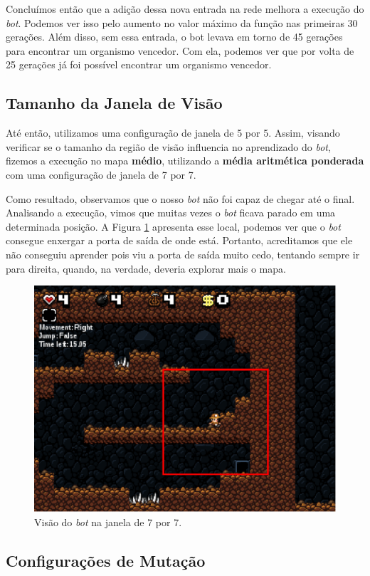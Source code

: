 Concluímos então que a adição dessa nova entrada na rede melhora a execução do
\textit{bot}. Podemos ver isso pelo aumento no valor máximo da função nas
primeiras 30 gerações. Além disso, sem essa entrada, o bot levava em torno de
45 gerações para encontrar um organismo vencedor. Com ela, podemos ver que por
volta de 25 gerações já foi possível encontrar um organismo vencedor.

\subsection{\label{section:experiment-vision}Tamanho da Janela de Visão}

Até então, utilizamos uma configuração de janela de 5 por 5. Assim, visando
verificar se o tamanho da região de visão influencia no aprendizado do
\textit{bot}, fizemos a execução no mapa \textbf{médio}, utilizando a
\textbf{média aritmética ponderada} com uma configuração de janela de 7 por 7.

Como resultado, observamos que o nosso \textit{bot} não foi capaz de chegar até
o final. Analisando a execução, vimos que muitas vezes o \textit{bot} ficava
parado em uma determinada posição. A Figura \ref{fig:experiment-medium-stuck}
apresenta esse local, podemos ver que o \textit{bot} consegue enxergar a porta
de saída de onde está. Portanto, acreditamos que ele não conseguiu aprender
pois viu a porta de saída muito cedo, tentando sempre ir para direita, quando,
na verdade, deveria explorar mais o mapa.

\begin{figure}[htb!]
\centering
\includegraphics[width=.5\textwidth]{fig/medium-7x7-stuck.pdf}
\caption{Visão do \textit{bot} na janela de 7 por 7.}
\label{fig:experiment-medium-stuck}
\end{figure}

\subsection{\label{section:experiment-mutation}Configurações de Mutação}

